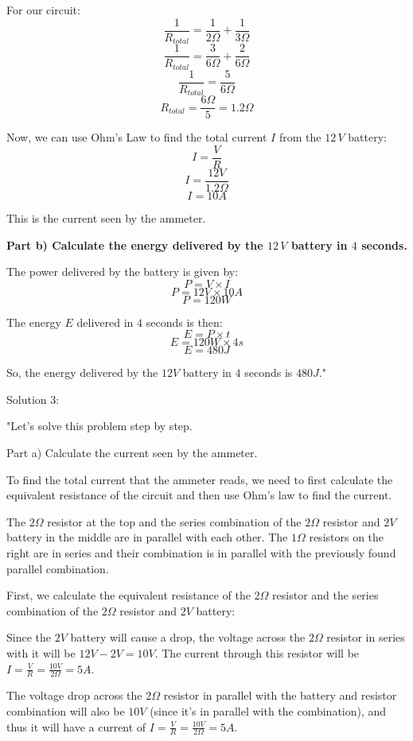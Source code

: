 For our circuit:
\[ \frac{1}{R_{total}} = \frac{1}{2\Omega} + \frac{1}{3\Omega} \]
\[ \frac{1}{R_{total}} = \frac{3}{6\Omega} + \frac{2}{6\Omega} \]
\[ \frac{1}{R_{total}} = \frac{5}{6\Omega} \]
\[ R_{total} = \frac{6\Omega}{5} = 1.2\Omega \]

Now, we can use Ohm's Law to find the total current \( I \) from the \(12\,V\) battery:
\[ I = \frac{V}{R} \]
\[ I = \frac{12V}{1.2\Omega} \]
\[ I = 10A \]

This is the current seen by the ammeter.

\textbf{Part b) Calculate the energy delivered by the \(12\,V\) battery in \(4\) seconds.}

The power delivered by the battery is given by:
\[ P = V \times I \]
\[ P = 12V \times 10A \]
\[ P = 120W \]

The energy \( E \) delivered in \( 4 \) seconds is then:
\[ E = P \times t \]
\[ E = 120W \times 4s \]
\[ E = 480J \]

So, the energy delivered by the \(12V\) battery in \(4\) seconds is \(480J\)."

Solution 3:

"Let's solve this problem step by step.

Part a) Calculate the current seen by the ammeter.

To find the total current that the ammeter reads, we need to first calculate the equivalent resistance of the circuit and then use Ohm's law to find the current.

The \(2\Omega\) resistor at the top and the series combination of the \(2\Omega\) resistor and \(2V\) battery in the middle are in parallel with each other. The \(1\Omega\) resistors on the right are in series and their combination is in parallel with the previously found parallel combination.

First, we calculate the equivalent resistance of the \(2\Omega\) resistor and the series combination of the \(2\Omega\) resistor and \(2V\) battery:

Since the \(2V\) battery will cause a drop, the voltage across the \(2\Omega\) resistor in series with it will be \( 12V - 2V = 10V \). The current through this resistor will be \( I = \frac{V}{R} = \frac{10V}{2\Omega} = 5A \).

The voltage drop across the \(2\Omega\) resistor in parallel with the battery and resistor combination will also be \(10V\) (since it's in parallel with the combination), and thus it will have a current of \( I = \frac{V}{R} = \frac{10V}{2\Omega} = 5A \).

